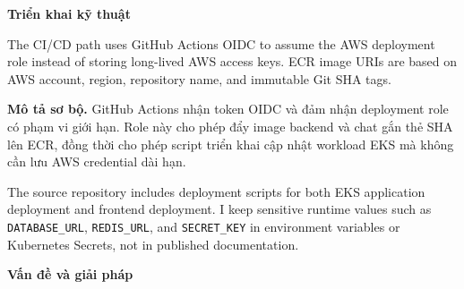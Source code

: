 \vspace{0.5em}\noindent\textbf{Triển khai kỹ
thuật}\par

The CI/CD path uses GitHub Actions OIDC to assume the AWS deployment
role instead of storing long-lived AWS access keys. ECR image URIs are
based on AWS account, region, repository name, and immutable Git SHA
tags.

\textbf{Mô tả sơ bộ.} GitHub Actions nhận token OIDC và đảm nhận
deployment role có phạm vi giới hạn. Role này cho phép đẩy image backend
và chat gắn thẻ SHA lên ECR, đồng thời cho phép script triển khai cập
nhật workload EKS mà không cần lưu AWS credential dài hạn.

The source repository includes deployment scripts for both EKS
application deployment and frontend deployment. I keep sensitive runtime
values such as \texttt{DATABASE\_\allowbreak{}URL}, \texttt{REDIS\_\allowbreak{}URL}, and
\texttt{SECRET\_\allowbreak{}KEY} in environment variables or Kubernetes Secrets, not
in published documentation.

\vspace{0.5em}\noindent\textbf{Vấn đề và giải
pháp}\par

